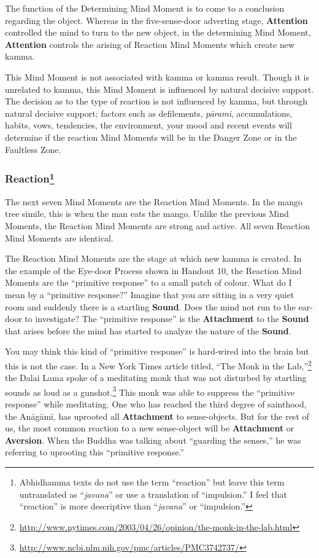 The function of the Determining Mind Moment is to come to a conclusion regarding the object. Whereas in the five-sense-door adverting stage, \textbf{Attention} controlled the mind to turn to the new object, in the determining Mind Moment, \textbf{Attention} controls the arising of Reaction Mind Moments which create new kamma.

This Mind Moment is not associated with kamma or kamma result. Though it is unrelated to kamma, this Mind Moment is influenced by natural decisive support. The decision as to the type of reaction is not influenced by kamma, but through natural decisive support; factors such as defilements, \textit{pārami}, accumulations, habits, vows, tendencies, the environment, your mood and recent events will determine if the reaction Mind Moments will be in the Danger Zone or in the Faultless Zone.

\subsubsection*{Reaction\footnote{Abhidhamma texts do not use the term “reaction” but leave this term untranslated as “\textit{javana}” or use a translation of “impulsion.” I feel that “reaction” is more descriptive than “\textit{javana}” or “impulsion.”}}

The next seven Mind Moments are the Reaction Mind Moments. In the mango tree simile, this is when the man eats the mango. Unlike the previous Mind Moments, the Reaction Mind Moments are strong and active. All seven Reaction Mind Moments are identical.

The Reaction Mind Moments are the stage at which new kamma is created. In the example of the Eye-door Process shown in Handout 10, the Reaction Mind Moments are the “primitive response” to a small patch of colour. What do I mean by a “primitive response?” Imagine that you are sitting in a very quiet room and suddenly there is a startling \textbf{Sound}. Does the mind not run to the ear-door to investigate? The “primitive response” is the \textbf{Attachment} to the \textbf{Sound} that arises before the mind has started to analyze the nature of the \textbf{Sound}.

You may think this kind of “primitive response” is hard-wired into the brain but this is not the case. In a New York Times article titled, “The Monk in the Lab,”\footnote{\url{http://www.nytimes.com/2003/04/26/opinion/the-monk-in-the-lab.html}} the Dalai Lama spoke of a meditating monk that was not disturbed by startling sounds as loud as a gunshot.\footnote{\url{http://www.ncbi.nlm.nih.gov/pmc/articles/PMC3742737/}} This monk was able to suppress the “primitive response” while meditating. One who has reached the third degree of sainthood, the Anāgāmī, has uprooted all \textbf{Attachment} to sense-objects. But for the rest of us, the most common reaction to a new sense-object will be \textbf{Attachment} or \textbf{Aversion}. When the Buddha was talking about “guarding the senses,” he was referring to uprooting this “primitive response.”


